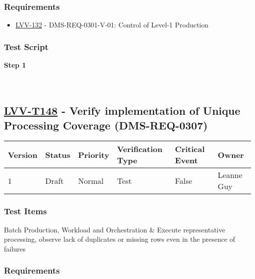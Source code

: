 \hypertarget{requirements-124}{%
\subsubsection{Requirements}\label{requirements-124}}

\begin{itemize}
\tightlist
\item
  \href{https://jira.lsstcorp.org/browse/LVV-132}{LVV-132} -
  DMS-REQ-0301-V-01: Control of Level-1 Production
\end{itemize}

\hypertarget{test-script-124}{%
\subsubsection{Test Script}\label{test-script-124}}

\textbf{Step 1}\\
~\\
~\\

\hypertarget{lvv-t148---verify-implementation-of-unique-processing-coverage-dms-req-0307}{%
\subsection{\texorpdfstring{\href{https://jira.lsstcorp.org/secure/Tests.jspa\#/testCase/LVV-T148}{LVV-T148}
- Verify implementation of Unique Processing Coverage
(DMS-REQ-0307)}{LVV-T148 - Verify implementation of Unique Processing Coverage (DMS-REQ-0307)}}\label{lvv-t148---verify-implementation-of-unique-processing-coverage-dms-req-0307}}

\begin{longtable}[]{@{}llllll@{}}
\toprule
Version & Status & Priority & Verification Type & Critical Event &
Owner\tabularnewline
\midrule
\endhead
1 & Draft & Normal & Test & False & Leanne Guy\tabularnewline
\bottomrule
\end{longtable}

\hypertarget{test-items-124}{%
\subsubsection{Test Items}\label{test-items-124}}

Batch Production, Workload and Orchestration \& Execute representative
processing, observe lack of duplicates or missing rows even in the
presence of failures

\hypertarget{requirements-125}{%
\subsubsection{Requirements}\label{requirements-125}}

